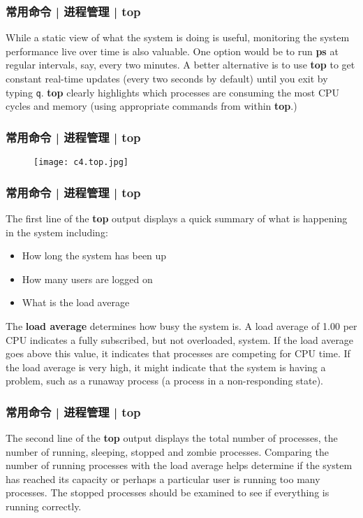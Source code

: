 \begin{frame}[fragile]
  \frametitle{常用命令 | 进程管理 | top}
  While a static view of what the system is doing is useful, monitoring the system performance live over time is also valuable. One option would be to run \textbf{ps} at regular intervals, say, every two minutes. A better alternative is to use \textbf{top} to get constant real-time updates (every two seconds by default) until you exit by typing \verb|q|. \textbf{top} clearly highlights which processes are consuming the most CPU cycles and memory (using appropriate commands from within \textbf{top}.)
\end{frame}

\begin{frame}
  \frametitle{常用命令 | 进程管理 | top}
  \begin{figure}
    \centering
    \texttt{[image: c4.top.jpg]}
  \end{figure}
\end{frame}

\begin{frame}
  \frametitle{常用命令 | 进程管理 | top}
  The first line of the \textbf{top} output displays a quick summary of what is happening in the system including:
  \begin{itemize}
    \item How long the system has been up
    \item How many users are logged on
    \item What is the load average
  \end{itemize}
  The \textbf{load average} determines how busy the system is. A load average of 1.00 per CPU indicates a fully subscribed, but not overloaded, system. If the load average goes above this value, it indicates that processes are competing for CPU time. If the load average is very high, it might indicate that the system is having a problem, such as a runaway process (a process in a non-responding state).
\end{frame}

\begin{frame}
  \frametitle{常用命令 | 进程管理 | top}
  The second line of the \textbf{top} output displays the total number of processes, the number of running, sleeping, stopped and zombie processes. Comparing the number of running processes with the load average helps determine if the system has reached its capacity or perhaps a particular user is running too many processes. The stopped processes should be examined to see if everything is running correctly.
\end{frame}


